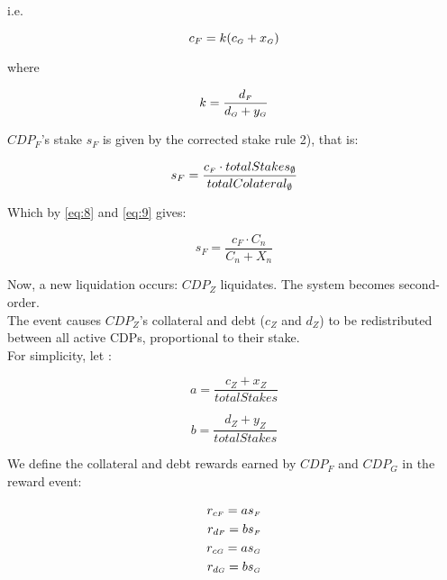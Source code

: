 \documentclass[reqno]{article}
\begin{document}
\bigskip
i.e.

\begin{equation} \label{eq:14}
    c_F=k(c_\mathsmaller{G}+x_\mathsmaller{G})
\end{equation}

\bigskip
where

\begin{equation} \label{eq:15}
    k=\frac{d_\mathsmaller{F}}{d_\mathsmaller{G}+y_\mathsmaller{G}}
\end{equation}


\bigskip
$CDP_F$’s stake $s_F$ is given by the corrected stake rule 2), that is:

\begin{equation} 
    s_F=\frac{c_\mathsmaller{F} \cdot totalStakes_\emptyset}{totalColateral_\emptyset}
\end{equation}

\bigskip
Which by \ref{eq:8} and \ref{eq:9} gives:

\begin{equation} \label{eq:17}
    s_F=\frac{c_F \cdot C_n}{C_n+X_n}
\end{equation}

\bigskip
Now, a new liquidation occurs: $CDP_Z$ liquidates. The system becomes second-order.\\

The event causes $CDP_Z$’s collateral and debt ($c_Z$ and $d_Z$) to be redistributed between all active CDPs, proportional to their stake.\\

For simplicity, let :

\begin{equation} 
    a=\frac{c_Z+x_Z}{totalStakes}
\end{equation}

\begin{equation} 
    b=\frac{d_Z+y_Z}{totalStakes}
\end{equation}

\bigskip
We define the collateral and debt rewards earned by $CDP_F$ and $CDP_G$ in the reward event:

\begin{equation} \label{eq:20}
    \begin{split}
        r_{c\mathsmaller{F}}=as_\mathsmaller{F}\\
        r_{d\mathsmaller{F}}=bs_\mathsmaller{F}\\
        r_{c\mathsmaller{G}}=as_\mathsmaller{G}\\
        r_{d\mathsmaller{G}}=bs_\mathsmaller{G}
    \end{split}
\end{equation}
\end{document}
